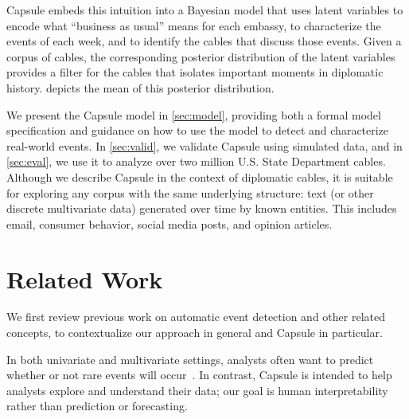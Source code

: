Capsule embeds this intuition into a Bayesian model that uses latent
variables to encode what ``business as usual'' means for each embassy,
to characterize the events of each week, and to identify the cables
that discuss those events. Given a corpus of cables, the corresponding
posterior distribution of the latent variables provides a filter for
the cables that isolates important moments in diplomatic
history.  depicts the mean of this posterior
distribution.

We present the Capsule model in \cref{sec:model}, providing both a
formal model specification and guidance on how to use the model to
detect and characterize real-world events. In \cref{sec:valid}, we
validate Capsule using simulated data, and in \cref{sec:eval},
we use it to analyze over two million U.S. State Department
cables. Although we describe Capsule in the context of diplomatic
cables, it is suitable for exploring any corpus with the same
underlying structure: text (or other discrete multivariate data)
generated over time by known entities. This includes email, consumer
behavior, social media posts, and opinion articles.

\section{Related Work}
\label{sec:relatedwork}


We first review previous work on automatic event detection and other
related concepts, to contextualize our approach in general and Capsule
in particular.


In both univariate and multivariate settings, analysts often want to
predict whether or not rare events will
occur~\cite{weiss1998learning,das2008anomaly}. In contrast, Capsule is
intended to help analysts explore and understand their data; our goal
is human interpretability rather than prediction or forecasting.

